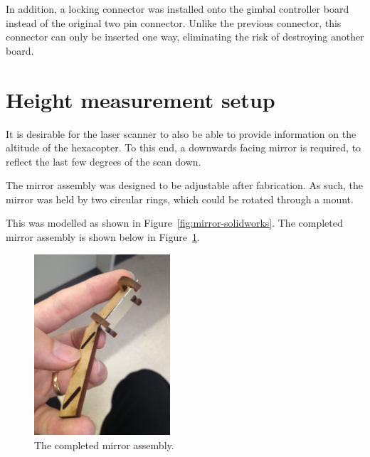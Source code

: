 \documentclass[12pt,oneside,a4paper]{book}
\begin{document}
In addition, a locking connector was installed onto the gimbal
controller board instead of the original two pin connector. Unlike the
previous connector, this connector can only be inserted one way,
eliminating the risk of destroying another board.

\section{Height measurement setup}
\label{sec:height-meas-setup}

It is desirable for the laser scanner to also be able to provide
information on the altitude of the hexacopter. To this end, a
downwards facing mirror is required, to reflect the last few degrees
of the scan down.

The mirror assembly was designed to be adjustable after
fabrication. As such, the mirror was held by two circular rings, which
could be rotated through a mount.

This was modelled as shown in Figure~\ref{fig:mirror-solidworks}. The
completed mirror assembly is shown below in Figure~\ref{fig:mirror}.

\begin{figure}[h]
  \centering
  \includegraphics[width=0.45\textwidth]{figs/mirror}
  \caption{The completed mirror assembly.}
  \label{fig:mirror}
\end{figure}
\end{document}

